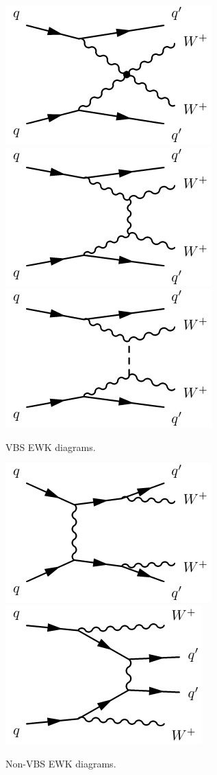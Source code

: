 
\begin{figure}[htbp]
  \centering
  \includegraphics[width=.32\textwidth]{figs/ssww_13tev/diagrams/vbs1}
  \includegraphics[width=.32\textwidth]{figs/ssww_13tev/diagrams/vbs2}
  \includegraphics[width=.32\textwidth]{figs/ssww_13tev/diagrams/vbs3}
  \caption{VBS EWK diagrams. }
  \label{fig:ssww13tev_diagrams_vbs}
\end{figure}

\begin{figure}[htbp]
  \centering
  \includegraphics[width=.32\textwidth]{figs/ssww_13tev/diagrams/ewk1}
  \includegraphics[width=.32\textwidth]{figs/ssww_13tev/diagrams/ewk2}
  \caption{Non-VBS EWK diagrams. }
  \label{fig:ssww13tev_diagrams_ewk}
\end{figure}

